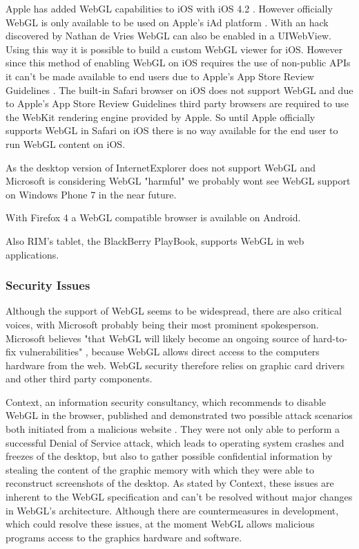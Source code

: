 \documentclass[12pt,journal,compsoc]{IEEEtran}
\begin{document}
\label{WebGLoniOS} Apple has added WebGL capabilities to iOS with iOS 4.2 \cite{deVries2011, iAdDocu}. However officially WebGL is only available to be used on Apple’s iAd platform \cite{deVries2011, cmarrin2011}. With an hack discovered by Nathan de Vries \cite{deVries2011} WebGL can also be enabled in a UIWebView. Using this way it is possible to build a custom WebGL viewer for iOS. However since this method of enabling WebGL on iOS requires the use of non-public APIs it can’t be made available to end users due to Apple's App Store Review Guidelines \cite{appstorereviewguidelines}. The built-in Safari browser on iOS does not support WebGL and due to Apple’s App Store Review Guidelines \cite{appstorereviewguidelines} third party browsers are required to use the WebKit rendering engine provided by Apple. So until Apple officially supports WebGL in Safari on iOS there is no way available for the end user to run WebGL content on iOS. 

As the desktop version of InternetExplorer does not support WebGL \cite{Golubovic2011} and Microsoft is considering WebGL "harmful" \cite{microsoftWebGLHarmful} we probably wont see WebGL support on Windows Phone 7 in the near future. 

With Firefox 4 a WebGL compatible browser is available on Android. %

Also RIM's tablet, the BlackBerry PlayBook, supports WebGL in web applications. %


\subsubsection{Security Issues}
Although the support of WebGL seems to be widespread, there are also critical voices, with Microsoft probably being their most prominent spokesperson. Microsoft believes "that WebGL will likely become an ongoing source of hard-to-fix vulnerabilities" \cite{microsoftWebGLHarmful}, because WebGL allows direct access to the computers hardware from the web. WebGL security therefore relies on graphic card drivers and other third party components. \cite{microsoftWebGLHarmful}

Context, an information security consultancy, which recommends to disable WebGL in the browser, published and demonstrated two possible attack scenarios both initiated from a malicious website \cite{contextWebGL1, contextWebGL2}. They were not only able to perform a successful Denial of Service attack, which leads to operating system crashes and freezes of the desktop, but also to gather possible confidential information by stealing the content of the graphic memory with which they were able to reconstruct screenshots of the desktop. As stated by Context, these issues are inherent to the WebGL specification and can't be resolved without major changes in WebGL's architecture. Although there are countermeasures in development, which could resolve these issues, at the moment WebGL allows malicious programs access to the graphics hardware and software. \cite{contextWebGL1, contextWebGL2}
\end{document}
